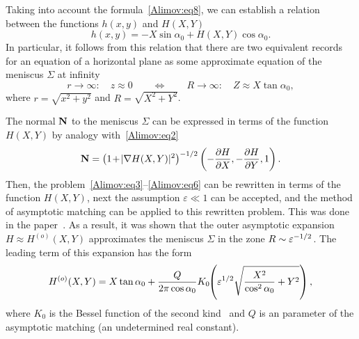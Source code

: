 \documentclass[
11pt,%
tightenlines,%
twoside,%
onecolumn,%
nofloats,%
nobibnotes,%
nofootinbib,%
superscriptaddress,%
noshowpacs,%
centertags]%
{revtex4-2}
\begin{document}
Taking into account the formula~\eqref{Alimov:eq8}, we can establish a relation between the
functions $h(x,y)$ and $H(X,Y)$
\[
 h(x,y) = - X\sin \alpha_0 + H(X,Y)\cos \alpha_0 .
\]
In particular, it follows from this relation that there are two equivalent records for an equation
of a horizontal plane as some approximate equation of the meniscus $\Sigma$ at infinity
\begin{equation}
\label{Alimov:eq10} r \to \infty :\quad z \approx 0\quad \quad \Leftrightarrow \quad \quad R \to
\infty :\quad Z \approx X\tan \alpha_0,
\end{equation}
where $r = \sqrt {x^2 + y^2} $ and $R = \sqrt {X^2 + Y^2} $.

The normal ${\rm {\bf N}}$ to the meniscus $\Sigma$ can be expressed in terms of the function
$H(X,Y)$ by analogy with~\eqref{Alimov:eq2}
\begin{equation}
\label{Alimov:eq11} {\rm {\bf N}} = \left( {1\hspace{-0.5mm}+\hspace{-0.5mm}\vert \nabla
H(X,Y)\vert^{2}} \right)^{-1/2}\left( { - \frac{\partial H}{\partial X}, - \frac{\partial
H}{\partial Y}, 1} \right).
\end{equation}
Then, the problem~\eqref{Alimov:eq3}--\eqref{Alimov:eq6} can be rewritten in terms of the function
$H(X,Y)$, next the assumption $\varepsilon \ll 1$ can be accepted, and the method of asymptotic
matching can be applied to this rewritten problem. This was done in the paper~\cite{Alimov:bib9}.
As a result, it was shown that the outer asymptotic expansion $H \approx H^{(o)}(X,Y)$ approximates
the meniscus $\Sigma$ in the zone $R \sim \varepsilon ^{-1 \left/ 2 \right.}$. The leading term of
this expansion has the form~\cite{Alimov:bib9}
\begin{equation}
\label{Alimov:eq12} H^{(o)}\hspace{-0.5mm}\left( {X,Y} \right) = X\tan \alpha_0 + \frac{Q}{2\pi
\cos \alpha_0} K_0\hspace{-1mm}\left({\varepsilon^{1/2}\sqrt{\frac{X^2}{\cos ^2\alpha_0
}+Y^2}}\right),
\end{equation}
 where $K_0$ is the Bessel function of the second kind~\cite{Alimov:bib14} and $Q$ is an
parameter of the asymptotic matching (an undetermined real constant).
\end{document}

